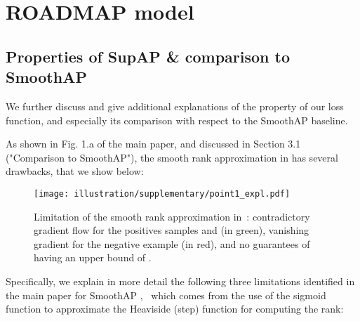 \setcounter{section}{0}
\renewcommand\thesection{\Alph{section}}


\section{ROADMAP model}
\label{sec:sup_roadmap}

\subsection{Properties of SupAP \& comparison to SmoothAP}

We further discuss and give additional explanations of the property of our  loss function, and especially its comparison with respect to the SmoothAP \cite{smoothap} baseline. 

As shown in Fig. 1.a of the main paper, and discussed in Section 3.1 ("Comparison to SmoothAP"), 
the smooth rank approximation in \cite{smoothap} has several drawbacks, that we show below: 
 \begin{figure*}[!hb]
     \centering
     \texttt{[image: illustration/supplementary/point1\_expl.pdf]}
     \caption{Limitation of the smooth rank approximation in~\cite{smoothap}: contradictory gradient flow for the positives samples  and  (in green), vanishing gradient for the negative example  (in red), and no guarantees of having an upper bound of .}
     \label{fig:comparison_smoothap_sup}
 \end{figure*}

Specifically, we explain in more detail the following three limitations identified in the main paper for SmoothAP \cite{smoothap}, ~which comes from the use of the sigmoid function to approximate the Heaviside (step) function for computing the rank: 


